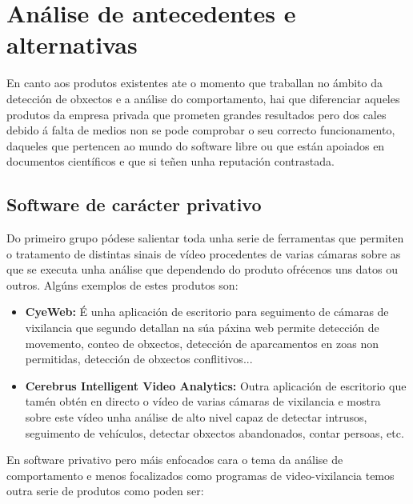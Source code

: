 \chapter{Análise de antecedentes e alternativas}
    En canto aos produtos existentes ate o momento que traballan no ámbito da detección de obxectos
    e a análise do comportamento, hai que diferenciar aqueles produtos da empresa
    privada que prometen grandes resultados pero dos cales debido á falta de medios non se pode 
    comprobar o seu correcto funcionamento, daqueles que pertencen ao mundo do software libre ou que
    están apoiados en documentos científicos e que si teñen unha reputación contrastada.
    
    
    \section{Software de carácter privativo}
    
        Do primeiro grupo pódese salientar toda unha serie de ferramentas que permiten o tratamento de 
        distintas sinais de vídeo procedentes de varias cámaras sobre as que se executa unha análise que
        dependendo do produto ofrécenos uns datos ou outros. Algúns exemplos de estes produtos son:
        
        \begin{itemize}
        \item \textbf{CyeWeb:}\cite{CyeWeb}
            É unha aplicación de escritorio para seguimento de cámaras de vixilancia que segundo 
            detallan na súa páxina web permite detección de movemento, conteo de obxectos, detección de
            aparcamentos en zoas non permitidas, detección de obxectos conflitivos...
            
        \item \textbf{Cerebrus Intelligent Video Analytics:}\cite{adventura-cerebrus-intelligent-video-analytics}
            Outra aplicación de escritorio que tamén obtén en directo o vídeo de varias cámaras de 
            vixilancia e mostra sobre este vídeo unha análise de alto nivel capaz de detectar intrusos,
            seguimento de vehículos, detectar obxectos abandonados, contar persoas, etc.
        \end{itemize}
        
        En software privativo pero máis enfocados cara o tema da análise de comportamento e menos
        focalizados como programas de video-vixilancia temos outra serie de produtos como poden ser:
        
